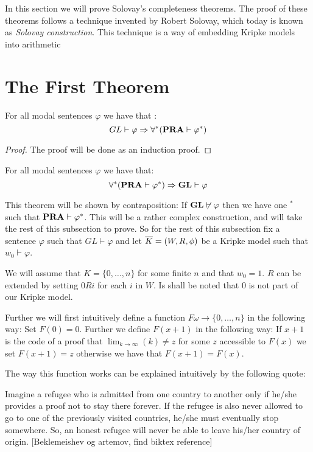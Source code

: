 \documentclass[../main.tex]{subfiles}
\begin{document}
In this section we will prove Solovay's completeness theorems. The proof of
these theorems follows a technique invented by Robert Solovay, which today is
known as \textit{Solovay construction}. This technique is a way of embedding
Kripke models into arithmetic

\section{The First Theorem}

\begin{lem}
	For all modal sentences $\varphi$ we have that :
	$$GL\vdash\varphi\Rightarrow\forall ^*(\text{\textbf{PRA}}\vdash\varphi^*)$$
\end{lem}
\begin{proof}
	The proof will be done as an induction proof.
\end{proof}
\begin{thm}
	For all modal sentences $\varphi$ we have that:
	$$\forall ^* (\text{\textbf{PRA}}\vdash \varphi^*)\Rightarrow \text{\textbf{GL}}\vdash \varphi$$
\end{thm}
This theorem will be shown by contraposition: If $\text{\textbf{GL}}\not\vdash \varphi$ then we
have one $^*$ such that $\text{\textbf{PRA}}\vdash\varphi^*$. This will be a rather complex
construction, and will take the rest of this subsection to prove. So for the
rest of this subsection fix a sentence $\varphi$ such that $GL\vdash \varphi$
and let $\overline{K}=(W,R,\phi)$ be a Kripke model such that $w_0\vdash\varphi$.

We will assume that $K=\{0,\ldots, n\}$ for some finite $n$ and that $w_0=1$.
$R$ can be extended by setting $0Ri$ for each $i$ in $W$. Is shall be noted
that $0$ is not part of our Kripke model.

Further we will first intuitively define a function $F\omega\rightarrow\{0,\ldots, n\}$ in the
following way: Set $F(0)=0$. Further we define $F(x+1)$ in the following way:
If $x+1$ is the code of a proof that $\lim_{k\rightarrow\infty}(k)\not =z$ for
some $z$ accessible to $F(x)$ we set $F(x+1)=z$ otherwise we have that
$F(x+1)=F(x)$.

The way this function works can be explained intuitively by the following
quote:
\begin{displayquote}
	Imagine a refugee who is admitted from one country to another only if
	he/she provides a proof not to stay there forever. If the refugee is
	also never allowed to go to one of the previously visited countries,
	he/she must eventually stop somewhere. So, an honest refugee will never
	be able to leave his/her country of origin. [Beklemeishev og artemov,
	find biktex reference]
\end{displayquote}
\end{document}
